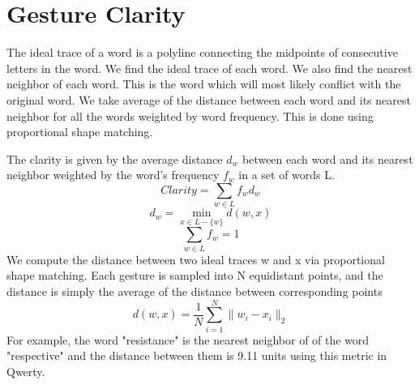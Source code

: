 \documentclass[MTech]{iitmdiss}
\begin{document}
\section{Gesture Clarity}
The ideal trace of a word is a polyline connecting the midpoints of consecutive letters in the word. We find the ideal trace of each word. We also find the nearest neighbor of each word. This is the word which will most likely conflict with the original word. We take average of the distance between each word and its nearest neighbor for all the words weighted by word frequency. This is done using proportional shape matching.

The clarity is given by the average distance $d_{w}$ between each word and its nearest neighbor weighted by the word's frequency $f_{w}$ in a set of words L.
\begin{equation}Clarity=\sum_{w \in L} f_{w} d_{w}\end{equation}
\begin{equation} d_{w}= \min_{x \in L - \{w\} } d(w,x) \end{equation} 
\begin{equation} \sum_{w \in L } f_{w} = 1\end{equation}
We compute the distance between two ideal traces w and x via proportional shape matching. Each gesture is sampled into N equidistant points, and the distance is simply the average of the distance between corresponding points
\begin{equation}
d(w,x) = \frac{1}{N} \sum_{i=1}^{N} \| w_{i} - x_{i} \|_{2}
\end{equation}
For example, the word "resistance" is the nearest neighbor of of the word "respective" and the distance between them is 9.11 units using this metric in Qwerty. 
\end{document}

